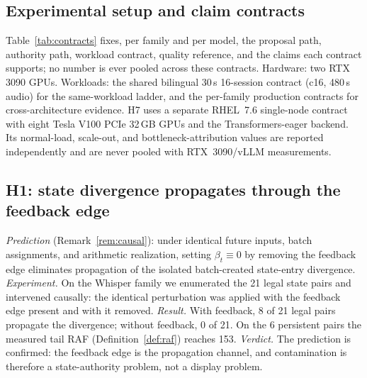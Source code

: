 
\subsection{Experimental setup and claim contracts}\label{sec:eval:setup}

Table~\ref{tab:contracts} fixes, per family and per model, the proposal
path, authority path, workload contract, quality reference, and the claims
each contract supports; no number is ever pooled across these contracts.
Hardware: two RTX 3090 GPUs. Workloads: the shared bilingual 30\,s
16-session contract (c16, 480\,s audio) for the same-workload ladder, and
the per-family production contracts for cross-architecture evidence.
H7 uses a separate RHEL~7.6 single-node contract with eight Tesla V100 PCIe
32\,GB GPUs and the Transformers-eager backend. Its normal-load, scale-out,
and bottleneck-attribution values are reported independently and are never
pooled with RTX~3090/vLLM measurements.


\subsection{H1: state divergence propagates through the feedback edge}
\label{sec:eval:h1}

\emph{Prediction} (Remark~\ref{rem:causal}): under identical future inputs,
batch assignments, and arithmetic realization, setting $\beta_t \equiv 0$
by removing the feedback edge eliminates propagation of the isolated
batch-created state-entry divergence.
\emph{Experiment.} On the Whisper family we enumerated the 21 legal state
pairs and intervened causally: the identical perturbation was applied with
the feedback edge present and with it removed.
\emph{Result.} With feedback, 8 of 21 legal pairs propagate the divergence;
without feedback, 0 of 21. On the 6 persistent pairs the measured tail RAF
(Definition~\ref{def:raf}) reaches 153.
\emph{Verdict.} The prediction is confirmed: the feedback edge is the
propagation channel, and contamination is therefore a state-authority
problem, not a display problem.

